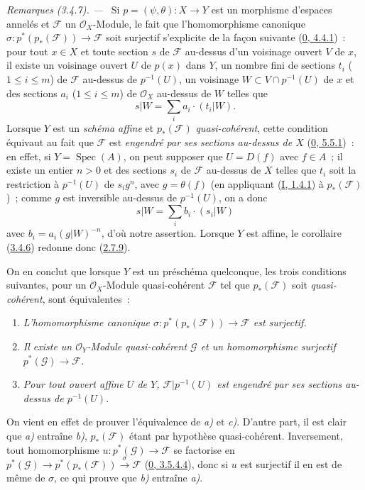 \par\medskip\noindent\textit{Remarques (3.4.7). ---\ }
\label{II.3.4.7-fr}
Si $p=(\psi,\theta):X\to Y$ est un morphisme d'espaces annelés et
$\mathcal{F}$ un $\mathcal{O}_X$-Module, le fait que l'homomorphisme canonique
$\sigma:p^*(p_*(\mathcal{F}))\to\mathcal{F}$ soit surjectif s'explicite de la
façon suivante (\hyperref[0.4.4.1-fr]{0, 4.4.1})~: pour tout $x\in X$ et toute
section $s$ de $\mathcal{F}$ au-dessus d'un voisinage ouvert $V$ de $x$, il
existe un voisinage ouvert $U$ de $p(x)$ dans $Y$, un nombre fini de sections
$t_i$ ($1\leq i\leq m$) de $\mathcal{F}$ au-dessus de $p^{-1}(U)$, un
voisinage $W\subset V\cap p^{-1}(U)$ de $x$ et des sections $a_i$
($1\leq i\leq m$) de $\mathcal{O}_X$ au-dessus de $W$ telles que
\[
  s|W=\sum_i a_i\cdot(t_i|W).
\]
Lorsque $Y$ est un \emph{schéma affine} et $p_*(\mathcal{F})$
\emph{quasi-cohérent}, cette condition équivaut au fait que $\mathcal{F}$ est
\emph{engendré par ses sections au-dessus de $X$}
(\hyperref[0.5.5.1-fr]{0, 5.5.1})~: en effet, si
$Y=\operatorname{Spec}(A)$, on peut supposer que $U=D(f)$ avec $f\in A$~; il
existe un entier $n>0$ et des sections $s_i$ de $\mathcal{F}$ au-dessus de
$X$ telles que $t_i$ soit la restriction à $p^{-1}(U)$ de $s_ig^n$, avec
$g=\theta(f)$ (en appliquant (\hyperref[I.1.4.1-fr]{I, 1.4.1}) à
$p_*(\mathcal{F})$)~; comme $g$ est inversible au-dessus de $p^{-1}(U)$, on a
donc
\[
  s|W=\sum_i b_i\cdot(s_i|W)
\]
avec $b_i=a_i(g|W)^{-n}$, d'où notre assertion. Lorsque $Y$ est affine, le
corollaire (\hyperref[II.3.4.6-fr]{3.4.6}) redonne donc
(\hyperref[II.2.7.9-fr]{2.7.9}).


On en conclut que lorsque $Y$ est un préschéma quelconque, les trois
conditions suivantes, pour un $\mathcal{O}_X$-Module quasi-cohérent
$\mathcal{F}$ tel que $p_*(\mathcal{F})$ soit \emph{quasi-cohérent}, sont
équivalentes~:
\begin{enumerate}
  \item[a)] \emph{L'homomorphisme canonique
    $\sigma:p^*(p_*(\mathcal{F}))\to\mathcal{F}$ est surjectif.}
  \item[b)] \emph{Il existe un $\mathcal{O}_Y$-Module quasi-cohérent
    $\mathcal{G}$ et un homomorphisme surjectif
    $p^*(\mathcal{G})\to\mathcal{F}$.}
  \item[c)] \emph{Pour tout ouvert affine $U$ de $Y$,
    $\mathcal{F}|p^{-1}(U)$ est engendré par ses sections au-dessus de
    $p^{-1}(U)$.}
\end{enumerate}
On vient en effet de prouver l'équivalence de \emph{a)} et \emph{c)}. D'autre
part, il est clair que \emph{a)} entraîne \emph{b)}, $p_*(\mathcal{F})$ étant
par hypothèse quasi-cohérent. Inversement, tout homomorphisme
$u:p^*(\mathcal{G})\to\mathcal{F}$ se factorise en
$p^*(\mathcal{G})\to p^*(p_*(\mathcal{F}))\xrightarrow{\sigma}\mathcal{F}$
(\hyperref[0.3.5.4.4-fr]{0, 3.5.4.4}), donc si $u$ est surjectif il en est de
même de $\sigma$, ce qui prouve que \emph{b)} entraîne \emph{a)}.


